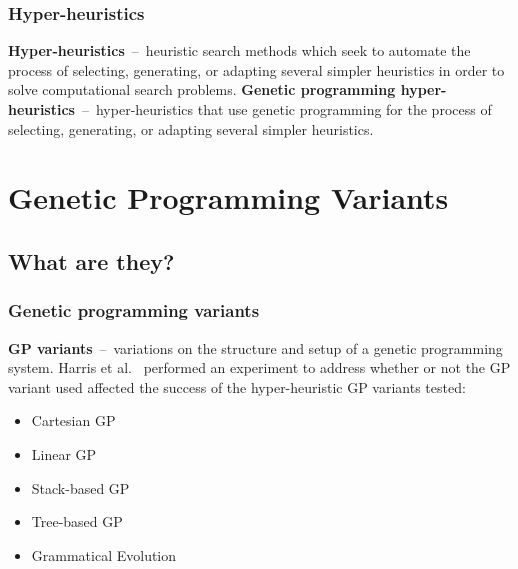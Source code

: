 \documentclass{beamer}
\newcommand{\linespace}{\vskip 0.25cm}
\begin{document}
\begin{frame}
	\frametitle{Hyper-heuristics}
	\textbf{Hyper-heuristics}~--~heuristic search methods which seek to automate the process of selecting, generating, or adapting several simpler heuristics in order to solve computational search problems.
	\linespace
	\pause
	\textbf{Genetic programming hyper-heuristics}~--~hyper-heuristics that use genetic programming for the process of selecting, generating, or adapting several simpler heuristics.
\end{frame}

\section[GP Variants]{Genetic Programming Variants}

\subsection{What are they?}

\begin{frame}
	\frametitle{Genetic programming variants}
	\textbf{GP variants}~--~variations on the structure and setup of a genetic programming system.
	\linespace
	\pause
	Harris et al.~\cite{harris:2015} performed an experiment to address whether or not the GP variant used affected the success of the hyper-heuristic
	\linespace
	\pause
	GP variants tested:
	\begin{itemize}
		\item Cartesian GP
		\item Linear GP
		\item Stack-based GP
		\item Tree-based GP
		\item Grammatical Evolution
	\end{itemize}
\end{frame}
\end{document}
